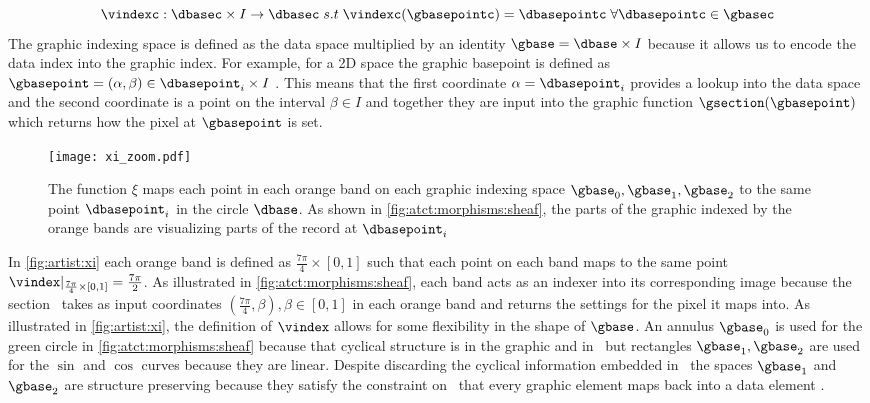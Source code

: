 \documentclass[review]{vgtc}
\theoremstyle{definition}
\theoremstyle{remark}
\begin{document}
\begin{equation}
  \vindexc: \dbasec \times I \rightarrow \dbasec\;s.t\;\vindexc(\gbasepointc) = \dbasepointc\;\forall \dbasepointc \in \gbasec
\end{equation}
The graphic indexing space is defined as the data space multiplied by an identity $\gbase = \dbase\times I$ because it allows us to encode the data index into the graphic index. For example, for a 2D space the graphic basepoint is defined as $\gbasepoint=(\alpha,\beta) \in \dbasepoint_i\times I$ . This means that the first coordinate $\alpha=\dbasepoint_i$ provides a lookup into the data space and the second coordinate is a point on the interval $\beta \in I$ and together they are input into the graphic function $\gsection(\gbasepoint)$ which returns how the pixel at $\gbasepoint$ is set.

\begin{figure}[H]
  \texttt{[image: xi\_zoom.pdf]}
  \caption{The function $\xi$ maps each point in each orange band on each graphic indexing space $\gbase_0, \gbase_1, \gbase_2$ to the same point $\dbasepoint_i$ in the circle $\dbase$. As shown in \autoref{fig:atct:morphisms:sheaf}, the parts of the graphic indexed by the orange bands are visualizing parts of the record at $\dbasepoint_i$ \label{fig:artist:xi}}
\end{figure}

In \autoref{fig:artist:xi} each orange band is defined as $\frac{7\pi}{4}\times [0,1]$ such that each point on each band maps to the same point $\vindex|_{\frac{7\pi}{4}\times [0,1]} = \frac{7\pi}{2}$. As illustrated in \autoref{fig:atct:morphisms:sheaf}, each band acts as an indexer into its corresponding image because the section \gsection\ takes as input coordinates $(\frac{7\pi}{4}, \beta), \beta \in [0,1]$ in each orange band and returns the settings for the pixel it maps into. As illustrated in \autoref{fig:artist:xi}, the definition of $\vindex$ allows for some flexibility in the shape of $\gbase$. An annulus $\gbase_0$ is used for the green circle in \autoref{fig:atct:morphisms:sheaf} because that cyclical structure is in the graphic and in \dbase\, but rectangles $\gbase_1, \gbase_2$ are used for the $\sin$ and $\cos$ curves because they are linear. Despite discarding the cyclical information embedded in \dbase\, the spaces $\gbase_1$ and $\gbase_2$ are structure preserving because they satisfy the constraint on \vindex\ that every graphic element maps back into a data element \cite{ziemkiewiczEmbeddingInformationVisualization2009}.
\end{document}
